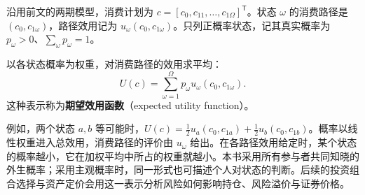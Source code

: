 \begin{tcolorbox}[knowledge,title=消费计划、消费路径与真实概率]
沿用前文的两期模型，消费计划为 $c=[c_0,c_{11},\ldots,c_{1\Omega}]^{\mathsf T}$。状态 $\omega$ 的消费路径是 $(c_0,c_{1\omega})$，路径效用记为 $u_\omega(c_0,c_{1\omega})$。只列正概率状态，记其真实概率为 $p_\omega>0$、$\sum_\omega p_\omega=1$。
\end{tcolorbox}
\begin{tcolorbox}[knowledge,title=期望效用表示]
以各状态概率为权重，对消费路径的效用求平均：
\begin{equation}
 U(c)=\sum_{\omega=1}^{\Omega}p_\omega u_\omega(c_0,c_{1\omega}).
 \label{eq:wj-six-1}
\end{equation}
这种表示称为\textbf{期望效用函数}（expected utility function）。
\end{tcolorbox}
例如，两个状态 $a,b$ 等可能时，$U(c)=\tfrac12u_a(c_0,c_{1a})+\tfrac12u_b(c_0,c_{1b})$。概率以线性权重进入总效用，消费路径的评价由 $u_\omega$ 给出。在各路径效用给定时，某个状态的概率越小，它在加权平均中所占的权重就越小。本书采用所有参与者共同知晓的外生概率；采用主观概率时，同一形式也可描述个人对状态的判断。后续的投资组合选择与资产定价会用这一表示分析风险如何影响持仓、风险溢价与证券价格。

